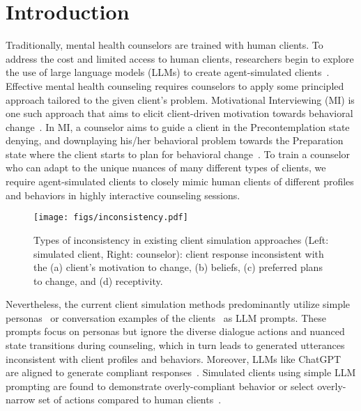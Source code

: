 \section{Introduction}

Traditionally, mental health counselors are trained with human clients. To address the cost and limited access to human clients, researchers begin to explore the use of large language models (LLMs) to create agent-simulated clients~\citep{yosef2024assessing, chiu2024computational, wang2024towards}. Effective mental health counseling requires counselors to apply some principled approach tailored to the given client's problem. Motivational Interviewing (MI) is one such approach that aims to elicit client-driven motivation towards behavioral change~\citep{miller2012motivational,prochaska1997transtheoretical, hashemzadeh2019transtheoretical}. In MI, a counselor aims to guide a client in the Precontemplation state denying, and downplaying his/her behavioral problem towards the Preparation state where the client starts to plan for behavioral change~\citep{abuse2019enhancing}. To train a counselor who can adapt to the unique nuances of many different types of clients\citep{hoang2024can}, we require agent-simulated clients to closely mimic human clients of different profiles and behaviors in highly interactive counseling sessions.

\begin{figure}[tb]
    \centering
    \texttt{[image: figs/inconsistency.pdf]}
    \caption{Types of inconsistency in existing client simulation approaches (Left: simulated client, Right: counselor):  client response inconsistent with the (a) client's motivation to change,  (b) beliefs, (c) preferred plans to change, and (d) receptivity.}
    \label{fig:inconsistency}
\end{figure}

Nevertheless, the current client simulation methods predominantly utilize simple personas~\citep{yosef2024assessing,wang2024towards} or conversation examples of the clients~\citep{chiu2024computational} as LLM prompts. These prompts focus on personas but ignore the diverse dialogue actions and nuanced state transitions during counseling, which in turn leads to generated utterances inconsistent with client profiles and behaviors. Moreover, LLMs like ChatGPT are aligned to generate compliant responses~\citep{shen2023large, kopf2024openassistant}. Simulated clients using simple LLM prompting are found to demonstrate overly-compliant behavior or select overly-narrow set of actions compared to human clients~\citep{kang2024can}. 

